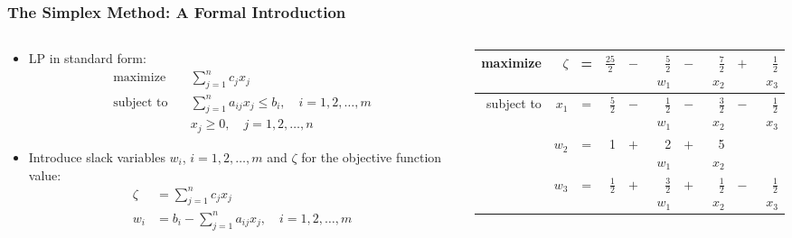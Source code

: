 \documentclass[usenames,dvipsnames,8pt]{beamer}%
\begin{document}
\begin{frame}
  \frametitle{The Simplex Method: A Formal Introduction}
  \begin{columns}
    \begin{column}{0.5\textwidth}
      \vspace{-9mm}
      \begin{itemize}
        \item LP in standard form: 
          \begin{align*}
            \text{maximize}  \quad&\sum_{j=1}^n c_j x_j \\
            \text{subject to}\quad&\sum_{j=1}^n a_{ij}x_j\leqslant b_i,\quad i = 1, 2, \ldots, m\\
                                  &x_j\geqslant 0, \quad j= 1, 2, \ldots, n 
          \end{align*}
        \item Introduce slack variables $w_i$, $i=1,2,\ldots,m$ and $\zeta$ for the objective function value: 
          \begin{align*}
            \zeta &= \sum_{j=1}^n c_j x_j \\
            w_i   &= b_i - \sum_{j=1}^n a_{ij}x_j,\quad i = 1, 2, \ldots, m
          \end{align*}
      \end{itemize}
    \end{column}
    \hspace{-3mm}
    \begin{column}{0.5\textwidth}
      \begin{table}[ht]
        \centering
        \setlength\tabcolsep{2pt}
        \begin{tabular}{rrcrcrcrcr}
          \toprule
          maximize   &$\zeta$& = &$\frac{25}{2}$ & $-$ & $\frac{5}{2}$ $w_1$ & $-$ & $\frac{7}{2}$ $x_2$ & $+$ & $\frac{1}{2}$ $x_3$\\
          \midrule
          subject to & $x_1$ & = & $\frac{5}{2}$ & $-$ & $\frac{1}{2}$ $w_1$ & $-$ & $\frac{3}{2}$ $x_2$ & $-$ & $\frac{1}{2}$ $x_3$\\
                     & $w_2$ & = &   1 & $+$ & 2   $w_1$ & $+$ & 5   $x_2$ &   &  \\
                     & $w_3$ & = & $\frac{1}{2}$ & $+$ & $\frac{3}{2}$ $w_1$ & $+$ & $\frac{1}{2}$ $x_2$ & $-$ & $\frac{1}{2}$ $x_3$\\ 
          \bottomrule
        \end{tabular}
      \end{table}
      \begin{itemize}

\end{itemize}
\end{column}
\end{columns}
\end{frame}
\end{document}
